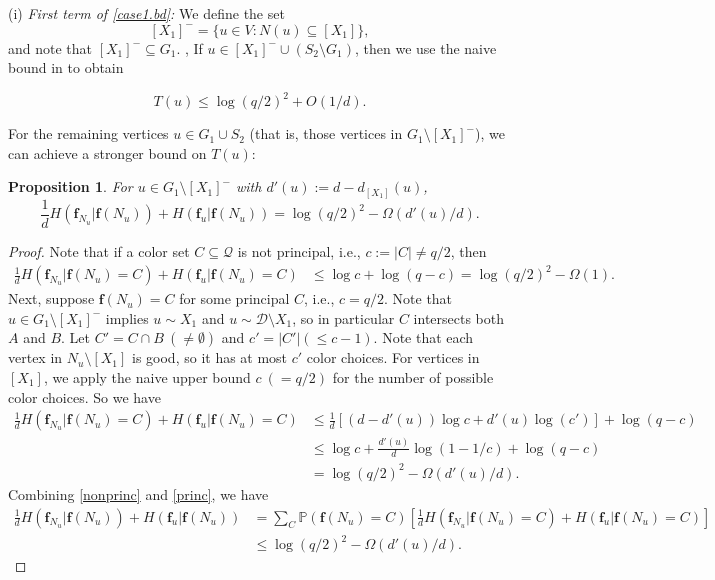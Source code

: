 \documentclass{amsart}
\newtheorem{prop}[thm]{Proposition}
\theoremstyle{definition}
\newcommand{\gO}{\Omega}
\newcommand{\cD}{\mathcal{D} }
\newcommand{\cQ}{\mathcal{Q} }
\newcommand{\bbf}{\mathbf{f}}
\newcommand{\beq}[1]{\begin{equation}\label{#1}}
\newcommand{\enq}[0]{\end{equation}}
\newcommand{\nin}[0]{\noindent}
\newcommand{\sub}[0]{\subseteq}
\newcommand{\0}[0]{\emptyset}
\newcommand{\pr}[0]{\mathbb{P}}
\newcommand{\qq}[0]{(q/2)^2}
\begin{document}
\nin (i) \textit{First term of \eqref{case1.bd}:} We define the set
\begin{equation}\label{xminus}
[X_1]^-=\{u \in V: N(u) \sub [X_1]\},
\end{equation} 
and note that $[X_1]^-\subseteq G_1$. , 
If $u \in [X_1]^- \cup (S_2 \setminus G_1)$, then we use the naive bound in  to obtain

\beq{case 1. first term 1} T(u) \le \log \qq +O(1/d).\enq

For the remaining vertices $u\in G_1\cup S_2$ (that is, those vertices in $G_1\setminus [X_1]^-$), we can achieve a stronger bound on $T(u)$:

\begin{prop}\label{prop5.3} 
	For $u \in G_1 \setminus [X_1]^-$               with $d'(u):=d-d_{[X_1]}(u)$,
\[ \frac{1}{d}H(\bbf_{N_u}|\bbf(N_u))+H(\bbf_u|\bbf(N_u))=\log \qq-\gO(d'(u)/d). \]
\end{prop}



\begin{proof}
Note that if a color set $C \sub \cQ$ is not principal, i.e., $c:=|C|\neq q/2$, then
\beq{nonprinc}\begin{split} \frac{1}{d}H(\bbf_{N_u}|\bbf(N_u)=C)+H(\bbf_u|\bbf(N_u)=C)& \le \log c +\log (q-c) =\log \qq-\gO(1).\end{split}\enq
Next, suppose $\bbf(N_u)=C$ for some principal $C$, i.e., $c= q/2$. Note that $u \in G_1 \setminus [X_1]^-$ implies $u \sim X_1$ and $u \sim \cD \setminus X_1$, so in particular $C$ intersects both $A$ and $B$. Let $C' = C \cap B ~ (\ne \emptyset)$ and $c'=|C'| (\le c-1)$. Note that each vertex in $N_u \setminus [X_1]$ is good, so it has at most $c'$ color choices. For vertices in $[X_1]$, we apply the naive upper bound $c~ (=q/2)$ for the number of possible color choices. So we have
\beq{princ}\begin{split} \frac{1}{d}H(\bbf_{N_u}|\bbf(N_u)=C)+H(\bbf_u|\bbf(N_u)=C)& \le \frac{1}{d}\left[(d-d'(u))\log c+d'(u)\log(c')\right]+\log (q-c)\\
&\le \log c+\frac{d'(u)}{d}\log(1-1/c)+\log(q-c)\\
&=\log\qq-\gO(d'(u)/d).\end{split}\enq
Combining \eqref{nonprinc} and \eqref{princ}, we have
\[ \begin{split} \frac{1}{d}H(\bbf_{N_u}|\bbf(N_u))+H(\bbf_u|\bbf(N_u))&=\sum_C\pr(\bbf(N_u)=C)\left[\frac{1}{d}H(\bbf_{N_u}|\bbf(N_u)=C)+H(\bbf_u|\bbf(N_u)=C)  \right]\\
&\le \log \qq-\gO(d'(u)/d). \end{split} \]

\vspace{-.6cm}

\end{proof}
\end{document}
